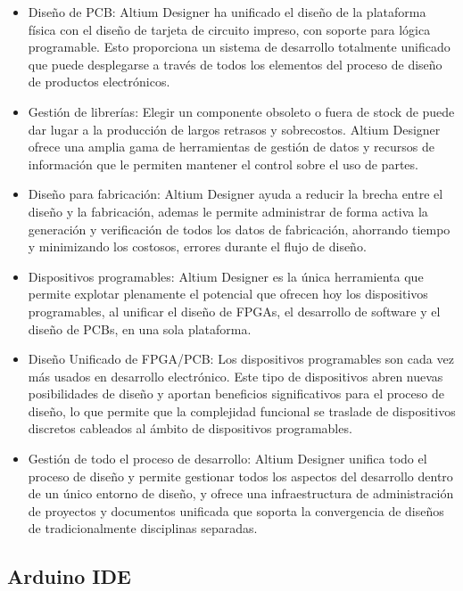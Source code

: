 \begin{itemize}
	\item Diseño de \acrshort{PCB}:
Altium Designer ha unificado el diseño de la plataforma física con el diseño de tarjeta de circuito impreso, con soporte para lógica programable. Esto proporciona un sistema de desarrollo totalmente unificado que puede desplegarse a través de todos los elementos del proceso de diseño de productos electrónicos.
	\item Gestión de librerías:
Elegir un componente obsoleto o fuera de stock de puede dar lugar a la producción de largos retrasos y sobrecostos. Altium Designer ofrece una amplia gama de herramientas de gestión de datos y recursos de información que le permiten mantener el control sobre el uso de partes.
	\item Diseño para fabricación:
Altium Designer ayuda a reducir la brecha entre el diseño y la fabricación, ademas le permite administrar de forma activa la generación y verificación de todos los datos de fabricación, ahorrando tiempo y minimizando los costosos, errores durante el flujo de diseño.
	\item Dispositivos programables:
Altium Designer es la única herramienta que permite explotar plenamente el potencial que ofrecen hoy los dispositivos programables, al unificar el diseño de \acrshort{FPGA}s, el desarrollo de software y el diseño de \acrshort{PCB}s, en una sola plataforma.
	\item Diseño Unificado de \acrshort{FPGA}/\acrshort{PCB}:
Los dispositivos programables son cada vez más usados en desarrollo electrónico. Este tipo de dispositivos abren nuevas posibilidades de diseño y aportan beneficios significativos para el proceso de diseño, lo que permite que la complejidad funcional se traslade de dispositivos discretos cableados al ámbito de dispositivos programables.
	\item Gestión de todo el proceso de desarrollo:
Altium Designer unifica todo el proceso de diseño y permite gestionar todos los aspectos del desarrollo dentro de un único entorno de diseño, y ofrece una infraestructura de administración de proyectos y documentos unificada que soporta la convergencia de diseños de tradicionalmente disciplinas separadas.
	
\end{itemize}

\subsection{Arduino IDE}


